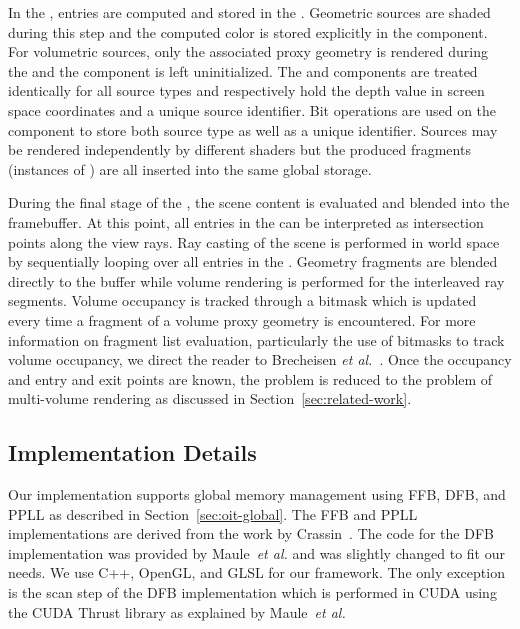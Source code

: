 \documentclass{egpubl}
\def\etal{\emph{et al.}}
\begin{document}
In the \sFill, \abs{} entries are computed and stored in the \bFraglist. 
Geometric sources are shaded during this step and the computed color is stored explicitly in the \cccol{} component. 
For volumetric sources, only the associated proxy geometry is rendered during the \sFill{} and the \cccol{} component is left uninitialized. 
The \ccz{} and \ccid{} components are treated identically for all source types and respectively hold the depth value in screen space coordinates and a unique source identifier. 
Bit operations are used on the \ccid{} component to store both source type as well as a unique identifier. 
Sources may be rendered independently by different shaders but the produced fragments (instances of \abs) are all inserted into the same global storage.

During the final stage of the \sResolve, the scene content is evaluated and blended into the framebuffer. 
At this point, all entries in the \bFraglist{} can be interpreted as intersection points along the view rays. 
Ray casting of the scene is performed in world space by sequentially looping over all entries in the \bFraglist. 
Geometry fragments are blended directly to the buffer while volume rendering is performed for the interleaved ray segments. 
Volume occupancy is tracked through a bitmask which is updated every time a fragment of a volume proxy geometry is encountered. 
For more information on fragment list evaluation, particularly the use of bitmasks to track volume occupancy, we direct the reader to Brecheisen \etal{}~\cite{brecheisen08multimodal}. 
Once the occupancy and entry and exit points are known, the problem is reduced to the problem of multi-volume rendering as discussed in Section~\ref{sec:related-work}. 


\subsection{Implementation Details}

Our implementation supports global memory management using FFB, DFB, and PPLL as described in Section~\ref{sec:oit-global}. 
The FFB and PPLL implementations are derived from the work by Crassin~\cite{Crassin2010}.
The code for the DFB implementation was provided by Maule~\etal \cite{Maule2012} and was slightly changed to fit our needs.
We use C++, OpenGL, and GLSL for our framework.
The only exception is the scan step of the DFB implementation which is performed in CUDA using the CUDA Thrust library as explained by Maule~\etal
\end{document}
